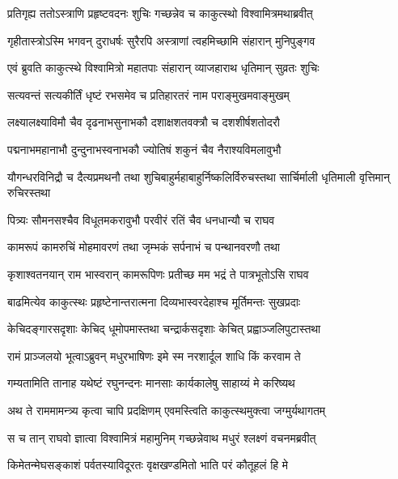 
\twolineshloka
{प्रतिगृह्य ततोऽस्त्राणि प्रहृष्टवदनः शुचिः}
{गच्छन्नेव च काकुत्स्थो विश्वामित्रमथाब्रवीत्} %

\twolineshloka
{गृहीतास्त्रोऽस्मि भगवन् दुराधर्षः सुरैरपि}
{अस्त्राणां त्वहमिच्छामि संहारान् मुनिपुङ्गव} %

\twolineshloka
{एवं ब्रुवति काकुत्स्थे विश्वामित्रो महातपाः}
{संहारान् व्याजहाराथ धृतिमान् सुव्रतः शुचिः} %

\twolineshloka
{सत्यवन्तं सत्यकीर्तिं धृष्टं रभसमेव च}
{प्रतिहारतरं नाम पराङ्मुखमवाङ्मुखम्} %

\twolineshloka
{लक्ष्यालक्ष्याविमौ चैव दृढनाभसुनाभकौ}
{दशाक्षशतवक्त्रौ च दशशीर्षशतोदरौ} %

\twolineshloka
{पद्मनाभमहानाभौ दुन्दुनाभस्वनाभकौ}
{ज्योतिषं शकुनं चैव नैराश्यविमलावुभौ} %

\threelineshloka
{यौगन्धरविनिद्रौ च दैत्यप्रमथनौ तथा}
{शुचिबाहुर्महाबाहुर्निष्कलिर्विरुचस्तथा}
{सार्चिर्माली धृतिमाली वृत्तिमान् रुचिरस्तथा} %

\twolineshloka
{पित्र्यः सौमनसश्चैव विधूतमकरावुभौ}
{परवीरं रतिं चैव धनधान्यौ च राघव} %

\twolineshloka
{कामरूपं कामरुचिं मोहमावरणं तथा}
{जृम्भकं सर्पनाभं च पन्थानवरणौ तथा} %

\twolineshloka
{कृशाश्वतनयान् राम भास्वरान् कामरूपिणः}
{प्रतीच्छ मम भद्रं ते पात्रभूतोऽसि राघव} %

\twolineshloka
{बाढमित्येव काकुत्स्थः प्रहृष्टेनान्तरात्मना}
{दिव्यभास्वरदेहाश्च मूर्तिमन्तः सुखप्रदाः} %

\twolineshloka
{केचिदङ्गारसदृशाः केचिद् धूमोपमास्तथा}
{चन्द्रार्कसदृशाः केचित् प्रह्वाञ्जलिपुटास्तथा} %

\twolineshloka
{रामं प्राञ्जलयो भूत्वाऽब्रुवन् मधुरभाषिणः}
{इमे स्म नरशार्दूल शाधि किं करवाम ते} %

\twolineshloka
{गम्यतामिति तानाह यथेष्टं रघुनन्दनः}
{मानसाः कार्यकालेषु साहाय्यं मे करिष्यथ} %

\twolineshloka
{अथ ते राममामन्त्र्य कृत्वा चापि प्रदक्षिणम्}
{एवमस्त्विति काकुत्स्थमुक्त्वा जग्मुर्यथागतम्} %

\twolineshloka
{स च तान् राघवो ज्ञात्वा विश्वामित्रं महामुनिम्}
{गच्छन्नेवाथ मधुरं श्लक्ष्णं वचनमब्रवीत्} %

\twolineshloka
{किमेतन्मेघसङ्काशं पर्वतस्याविदूरतः}
{वृक्षखण्डमितो भाति परं कौतूहलं हि मे} %

